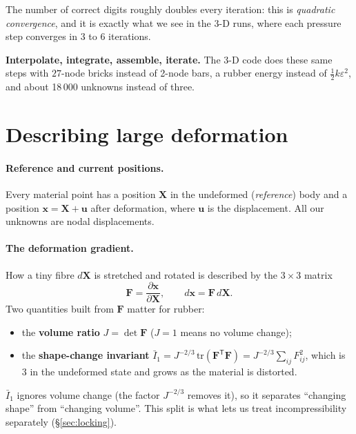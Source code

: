 \documentclass[11pt,a4paper]{article}
\numberwithin{equation}{section}
\newcommand{\F}{\mathbf{F}}
\newcommand{\X}{\mathbf{X}}
\newcommand{\x}{\mathbf{x}}
\newcommand{\uu}{\mathbf{u}}
\newcommand{\Ib}{\bar I_1}
\begin{document}
The number of correct digits roughly doubles every iteration: this is
\emph{quadratic convergence}, and it is exactly what we see in the 3-D runs, where
each pressure step converges in 3 to 6 iterations.

\begin{idea}
\textbf{Interpolate, integrate, assemble, iterate.} The 3-D code does these same
steps with $27$-node bricks instead of 2-node bars, a rubber energy instead of
$\tfrac12k\varepsilon^2$, and about 18\,000 unknowns instead of three.
\end{idea}

\section{Describing large deformation}
\label{sec:kin}

\paragraph{Reference and current positions.}
Every material point has a position $\X$ in the undeformed (\emph{reference}) body
and a position $\x=\X+\uu$ after deformation, where $\uu$ is the displacement. All our
unknowns are nodal displacements.

\paragraph{The deformation gradient.}
How a tiny fibre $d\X$ is stretched and rotated is described by the $3\times3$ matrix
\begin{equation}
\F=\frac{\partial\x}{\partial\X},\qquad d\x=\F\,d\X .
\end{equation}
Two quantities built from $\F$ matter for rubber:
\begin{itemize}[nosep]
\item the \textbf{volume ratio} $J=\det\F$ ($J=1$ means no volume change);
\item the \textbf{shape-change invariant}
$\Ib=J^{-2/3}\,\mathrm{tr}(\F^{\mathsf T}\F)=J^{-2/3}\sum_{ij}F_{ij}^2$, which is $3$
in the undeformed state and grows as the material is distorted.
\end{itemize}
$\Ib$ ignores volume change (the factor $J^{-2/3}$ removes it), so it separates
``changing shape'' from ``changing volume''. This split is what lets us treat
incompressibility separately (\S\ref{sec:locking}).
\end{document}
